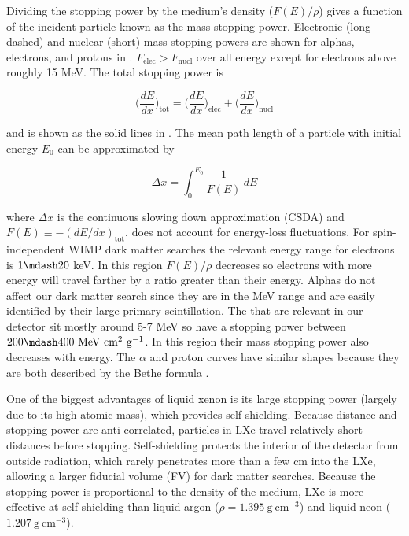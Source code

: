 Dividing the stopping power by the medium's density ($F(E) / \rho$) gives a function of the incident particle known as
the mass stopping power.  Electronic (long dashed) and nuclear (short) mass stopping powers are shown for alphas, electrons, and protons
in .  $F_{\mathrm{elec}} > F_{\mathrm{nucl}}$ over all energy except for electrons above roughly 15
MeV.  The total stopping power is

\begin{equation}
\bigg( \frac{dE}{dx} \bigg)_{\mathrm{tot}} = \bigg( \frac{dE}{dx} \bigg)_{\mathrm{elec}} + \bigg( \frac{dE}{dx} \bigg)_{\mathrm{nucl}}
\end{equation}

\noindent and is shown as the solid lines in .  The mean path length of a particle with initial energy
$E_0$ can be approximated by

\begin{equation}
\Delta x = \int_0^{E_0} \frac{1}{F(E)}\, dE
\label{eq:stopping_power_dist_trav}
\end{equation}

\noindent where $\Delta x$ is the continuous slowing down approximation (CSDA) and
$F(E) \equiv -(dE/dx)_{\mathrm{tot}}$.   does not account for energy-loss
fluctuations.  For spin-independent
WIMP dark matter searches the relevant energy range for electrons is $1 \mdash 20$ keV.  In this region $F(E)/\rho$ decreases so
electrons with more energy will travel farther by a ratio greater than their energy.  Alphas do not affect
our dark matter search since they are in the MeV range and are easily identified by their large primary scintillation.  The
\alphadecays that are relevant in our detector sit mostly around 5-7 MeV so have a stopping power between
$200 \mdash 400\ \mathrm{MeV\ cm^2\ g^{-1}}$.  In this region their mass stopping power also decreases with energy.  The $\alpha$ and
proton curves have similar shapes because they are both described by the Bethe formula .

One of the biggest advantages of liquid xenon is its large stopping power (largely due to its high atomic
mass), which provides self-shielding.  Because distance and stopping power are anti-correlated, particles in LXe travel relatively short
distances before stopping.  Self-shielding protects the interior of the detector from outside radiation,
which rarely penetrates more than a few cm
into the LXe, allowing a larger fiducial volume (FV) for dark matter searches.  Because the stopping power is proportional to the
density of the medium, LXe is more effective at self-shielding than liquid argon ($\rho = 1.395\ \mathrm{g\ cm^{-3}}$) and liquid neon
($1.207\ \mathrm{g\ cm^{-3}}$).

